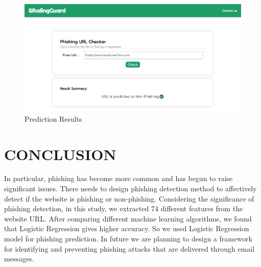\documentclass[conference]{IEEEtran}
\begin{document}
\begin{figure}[H]
\centerline{\includegraphics[scale=0.2]{uiN.png}}
\caption{Prediction Results}
\label{fig}
\end{figure}

\section{CONCLUSION}
\par In particular, phishing has become more common and
has begun to raise significant issues. There needs to design phishing 
 detection method to affectively detect if the website is phishing or non-phishing. Considering the significance of phishing detection,
in this study, we extracted 74 different features from the website URL. After comparing different machine learning algorithms, we found that Logistic Regression gives higher accuracy. So we used Logistic Regression model for phishing prediction. In future we are planning to design a
framework for identifying and preventing phishing attacks that are delivered through email messages.
\end{document}
